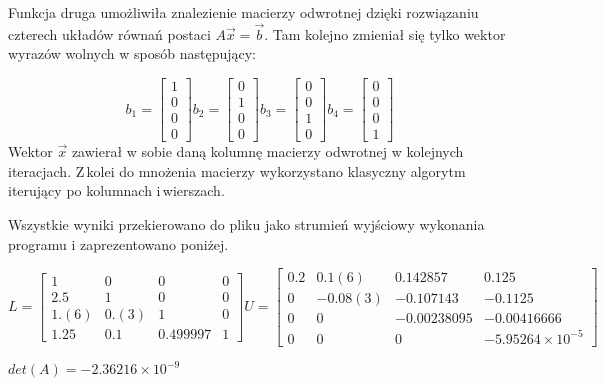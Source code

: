 Funkcja druga umożliwiła znalezienie macierzy odwrotnej dzięki rozwiązaniu czterech układów równań postaci $ A\vec{x} =\vec{b} $. Tam kolejno zmieniał się tylko wektor wyrazów wolnych w sposób następujący:

\begin{equation}
b_1 = 
\begin{bmatrix}
1\\0\\0\\0
\end{bmatrix}
b_2 = 
\begin{bmatrix}
0\\1\\0\\0
\end{bmatrix}
b_3 = 
\begin{bmatrix}
0\\0\\1\\0
\end{bmatrix}
b_4 = 
\begin{bmatrix}
0\\0\\0\\1
\end{bmatrix}
\end{equation}
Wektor $ \vec{x} $ zawierał w sobie daną kolumnę macierzy odwrotnej w kolejnych iteracjach. Z\,kolei do mnożenia macierzy wykorzystano klasyczny algorytm iterujący po kolumnach i\,wierszach.

Wszystkie wyniki przekierowano do pliku jako strumień wyjściowy wykonania programu i zaprezentowano poniżej.

\begin{equation*}
L = 
\begin{bmatrix}
1 &0& 0& 0 \\
2.5 &1 &0& 0 \\
1.(6)& 0.(3)& 1& 0 \\
1.25 &0.1 &0.499997 &1 
\end{bmatrix}
U = 
\begin{bmatrix}
0.2& 0.1(6) &0.142857& 0.125 \\
0 &-0.08(3)& -0.107143& -0.1125\\ 
0 &0 &-0.00238095& -0.00416666 \\
0 &0& 0& -5.95264\times 10^{-5}
\end{bmatrix}
\end{equation*}

\begin{center}
	$ det(A) = -2.36216 \times 10^{-9} $
\end{center}


